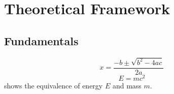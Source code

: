 \chapter{Theoretical Framework}
\label{ch:theory}

\blindtext

\section{Fundamentals}
\label{sec:fundamentals}

\blindtext
%
\begin{equation}
x = \frac{-b \pm \sqrt{b^2 - 4ac}}{2a}
\end{equation}
\blindtext
%
\begin{equation}\label{eq:emc2}
E=mc^2
\end{equation}
%
 shows the equivalence of energy $E$ and mass $m$.

